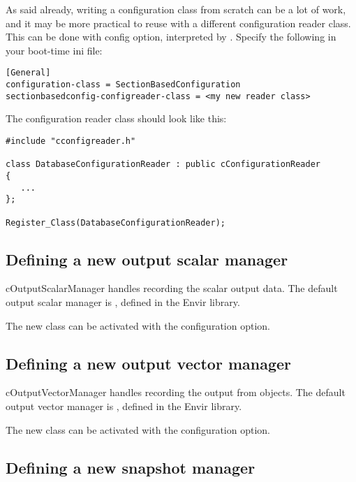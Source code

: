 As said already, writing a configuration class from scratch can
be a lot of work, and it may be more practical to reuse
 with a different configuration
reader class. This can be done with 
config option, interpreted by .
Specify the following in your boot-time ini file:

\begin{verbatim}
[General]
configuration-class = SectionBasedConfiguration
sectionbasedconfig-configreader-class = <my new reader class>
\end{verbatim}

The configuration reader class should look like this:

\begin{verbatim}
#include "cconfigreader.h"

class DatabaseConfigurationReader : public cConfigurationReader
{
   ...
};

Register_Class(DatabaseConfigurationReader);
\end{verbatim}


\subsection{Defining a new output scalar manager}
\label{sec:plugin-exts:outputscalarmanager}

cOutputScalarManager handles recording the scalar output data.
The default output scalar manager is ,
defined in the Envir library.

The new class can be activated with the 
configuration option.


\subsection{Defining a new output vector manager}
\label{sec:plugin-exts:outputvectormanager}

cOutputVectorManager handles recording the output from  objects.
The default output vector manager is ,
defined in the Envir library.

The new class can be activated with the 
configuration option.


\subsection{Defining a new snapshot manager}
\label{sec:plugin-exts:snapshotmanager}

